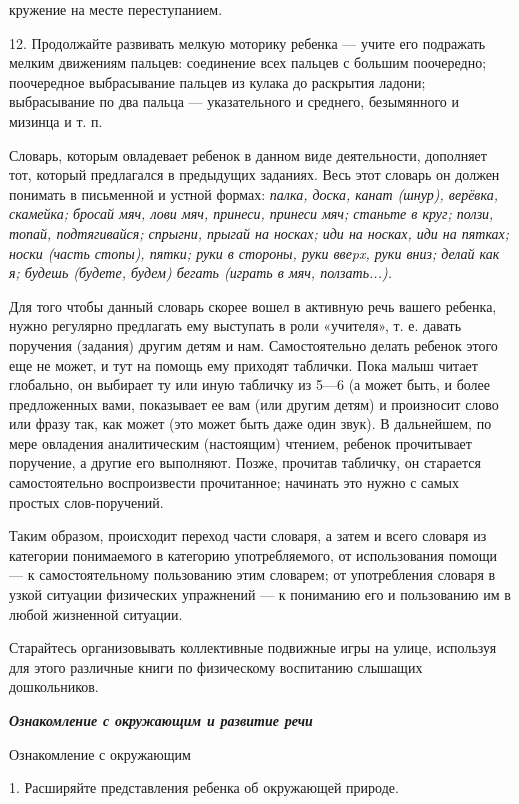 \documentclass[a5paper]{book}
\renewcommand{\emph}[1]{\textit{#1}}
\begin{document}
кружение на месте переступанием.

12. Продолжайте развивать мелкую моторику ребенка --- учите его
подражать мелким движениям пальцев: соединение всех пальцев с большим
поочередно; поочередное выбрасывание пальцев из кулака до раскрытия
ладони; выбрасывание по два пальца --- указательного и среднего,
безымянного и мизинца и т. п.

Словарь, которым овладевает ребенок в данном виде деятельности,
дополняет тот, который предлагался в предыдущих заданиях. Весь этот
словарь он должен понимать в письменной и устной формах: \emph{палка,
доска, канат (шнур), верёвка, скамейка; бросай мяч, лови мяч, принеси,
принеси мяч; станьте в круг; ползи, топай, подтягивайся; спрыгни, прыгай
на носках; иди на носках, иди на пятках; носки (часть стопы), пятки;
руки в стороны, руки ввеpx, руки вниз; делай как я; будешь (будете,
будем) бегать (играть в мяч, ползать...).}

Для того чтобы данный словарь скорее вошел в активную речь вашего
ребенка, нужно регулярно предлагать ему выступать в роли «учителя», т.
е. давать поручения (задания) другим детям и нам. Самостоятельно делать
ребенок этого еще не может, и тут на помощь ему приходят таблички. Пока
малыш читает глобально, он выбирает ту или иную табличку из 5---6 (а
может быть, и более предложенных вами, показывает ее вам (или другим
детям) и произносит слово или фразу так, как может (это может быть даже
один звук). В дальнейшем, по мере овладения аналитическим (настоящим)
чтением, ребенок прочитывает поручение, а другие его выполняют. Позже,
прочитав табличку, он старается самостоятельно воспроизвести
прочитанное; начинать это нужно с самых простых слов-поручений.

Таким образом, происходит переход части словаря, а затем и всего словаря
из категории понимаемого в категорию употребляемого, от использования
помощи --- к самостоятельному пользованию этим словарем; от употребления
словаря в узкой ситуации физических упражнений --- к пониманию его и
пользованию им в любой жизненной ситуации.

Старайтесь организовывать коллективные подвижные игры на улице,
используя для этого различные книги по физическому воспитанию слышащих
дошкольников.

\emph{\textbf{Ознакомление с окружающим и развитие речи}}

Ознакомление с окружающим

1. Расширяйте представления ребенка об окружающей природе.
\end{document}
